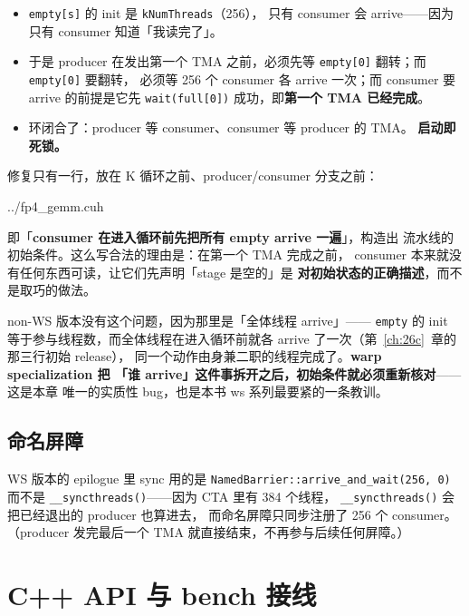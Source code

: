 \begin{itemize}[itemsep=2pt,topsep=3pt]
  \item \texttt{empty[s]} 的 init 是 \texttt{kNumThreads}（256），
        只有 consumer 会 arrive——因为只有 consumer 知道「我读完了」。
  \item 于是 producer 在发出第一个 TMA 之前，必须先等
        \texttt{empty[0]} 翻转；而 \texttt{empty[0]} 要翻转，
        必须等 256 个 consumer 各 arrive 一次；而 consumer 要 arrive
        的前提是它先 \texttt{wait(full[0])} 成功，即\textbf{第一个 TMA
        已经完成}。
  \item 环闭合了：producer 等 consumer、consumer 等 producer 的 TMA。
        \textbf{启动即死锁。}
\end{itemize}

修复只有一行，放在 K 循环之前、producer/consumer 分支之前：

\begin{lstinputlisting}[linerange={958-964},firstnumber=auto,
  title={fp4\_gemm.cuh L958-964（WS 的 empty 预置：consumer 先行 arrive）}]{../fp4_gemm.cuh}
\end{lstinputlisting}

即「\textbf{consumer 在进入循环前先把所有 empty arrive 一遍}」，构造出
流水线的初始条件。这么写合法的理由是：在第一个 TMA 完成之前，
consumer 本来就没有任何东西可读，让它们先声明「stage 是空的」是
\textbf{对初始状态的正确描述}，而不是取巧的做法。

non-WS 版本没有这个问题，因为那里是「全体线程 arrive」——
\texttt{empty} 的 init 等于参与线程数，而全体线程在进入循环前就各
arrive 了一次（第~\ref{ch:26c}~章的那三行初始 release），
同一个动作由身兼二职的线程完成了。\textbf{warp specialization 把
「谁 arrive」这件事拆开之后，初始条件就必须重新核对}——这是本章
唯一的实质性 bug，也是本书 ws 系列最要紧的一条教训。

\subsection{命名屏障}

WS 版本的 epilogue 里 sync 用的是 \texttt{NamedBarrier::arrive\_and\_wait(256, 0)}
而不是 \texttt{\_\_syncthreads()}——因为 CTA 里有 384 个线程，
\texttt{\_\_syncthreads()} 会把已经退出的 producer 也算进去，
而命名屏障只同步注册了 256 个 consumer。（producer 发完最后一个 TMA
就直接结束，不再参与后续任何屏障。）

\section{C++ API 与 bench 接线}\label{sec:37-api}


